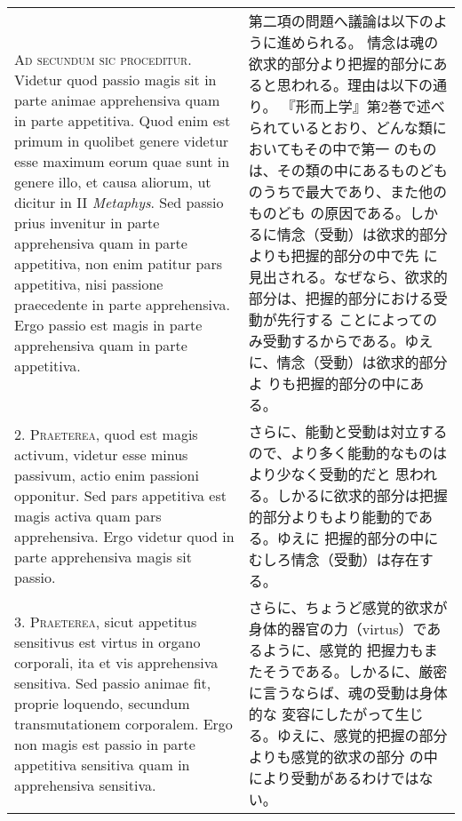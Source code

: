 \documentclass[10pt]{jsarticle} %
\begin{document}
\begin{longtable}{p{21em}p{21em}}

{\scshape Ad secundum sic proceditur}. Videtur quod passio magis sit in parte
 animae apprehensiva quam in parte appetitiva. Quod enim est primum in
 quolibet genere videtur esse maximum eorum quae sunt in genere illo, et
 causa aliorum, ut dicitur in II {\itshape Metaphys}. Sed passio prius invenitur in
 parte apprehensiva quam in parte appetitiva, non enim patitur pars
 appetitiva, nisi passione praecedente in parte apprehensiva. Ergo
 passio est magis in parte apprehensiva quam in parte appetitiva.


&

第二項の問題へ議論は以下のように進められる。
情念は魂の欲求的部分より把握的部分にあると思われる。理由は以下の通り。
『形而上学』第2巻で述べられているとおり、どんな類においてもその中で第一
 のものは、その類の中にあるものどものうちで最大であり、また他のものども
 の原因である。しかるに情念（受動）は欲求的部分よりも把握的部分の中で先
 に見出される。なぜなら、欲求的部分は、把握的部分における受動が先行する
 ことによってのみ受動するからである。ゆえに、情念（受動）は欲求的部分よ
 りも把握的部分の中にある。

\\



2. {\scshape Praeterea}, quod est magis activum, videtur esse minus passivum, actio
 enim passioni opponitur. Sed pars appetitiva est magis activa quam pars
 apprehensiva. Ergo videtur quod in parte apprehensiva magis sit passio.


&

さらに、能動と受動は対立するので、より多く能動的なものはより少なく受動的だと
 思われる。しかるに欲求的部分は把握的部分よりもより能動的である。ゆえに
 把握的部分の中にむしろ情念（受動）は存在する。

\\


3. {\scshape Praeterea}, sicut appetitus sensitivus est virtus in organo
 corporali, ita et vis apprehensiva sensitiva. Sed passio animae fit,
 proprie loquendo, secundum transmutationem corporalem. Ergo non magis
 est passio in parte appetitiva sensitiva quam in apprehensiva
 sensitiva.



&


さらに、ちょうど感覚的欲求が身体的器官の力（virtus）であるように、感覚的
 把握力もまたそうである。しかるに、厳密に言うならば、魂の受動は身体的な
 変容にしたがって生じる。ゆえに、感覚的把握の部分よりも感覚的欲求の部分
 の中により受動があるわけではない。


\end{longtable}
\end{document}
